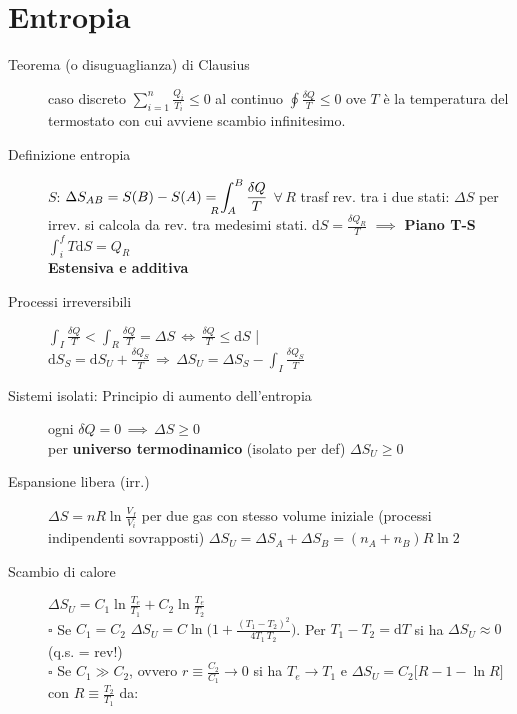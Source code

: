 \documentclass[10pt, oneside]{article}
\begin{document}
\section{Entropia}
\begin{description}
\item[\large Teorema (o disuguaglianza) di Clausius] caso discreto $\boxed{\displaystyle \sum\limits_{i=1}^n \frac{Q_i}{T_i} \leq 0}$ al continuo $\boxed{\displaystyle \oint \frac{\delta Q}{T} \leq 0}$ ove $T$ è la temperatura del termostato con cui avviene scambio infinitesimo.
\item[Definizione entropia] $S$: $\displaystyle \Delta S_{AB} = S(B) - S(A) = \int_{\hspace{-0.45cm} R \hspace{0.22cm} A}^B\frac{\delta Q}{T}$ $\forall \, R$ trasf rev. tra i due stati: $\Delta S$ per irrev. si calcola da rev. tra medesimi stati. $\displaystyle \mathrm{d}S = \frac{\delta Q_R}{T}$ $\implies$ \textbf{Piano T-S} $\displaystyle \int_i^f T\mathrm{d}S = Q_R$
\\\textbf{Estensiva e additiva}
\item[Processi irreversibili] $\displaystyle \int_I\frac{\delta Q}{T} < \int_R\frac{\delta Q}{T} = \Delta S \, \Leftrightarrow \, \frac{\delta Q}{T} \leq \mathrm{d}S$ \hfill \bigg| \hfill $\displaystyle \mathrm{d}S_S = \mathrm{d}S_U + \frac{\delta Q_S}{T} \, \Rightarrow \, \displaystyle \Delta S_U = \Delta S_S - \int_I \frac{\delta Q_S}{T}$
\item[Sistemi isolati: \large Principio di aumento dell'entropia] ogni $\delta Q = 0 \, \implies \, \Delta S \geq 0$ \\per \textbf{universo termodinamico} (isolato per def) $\displaystyle \Delta S_U \geq 0$
\item[Espansione libera (irr.)] $\displaystyle \Delta S = n R \ln \frac{V_f}{V_i}$ per due gas con stesso volume iniziale (processi indipendenti sovrapposti) $\displaystyle \Delta S_U = \Delta S_A + \Delta S_B = (n_A + n_B) R \ln2$
\item[Scambio di calore] $\displaystyle \Delta S_U = C_1 \ln \frac{T_e}{T_1} + C_2 \ln \frac{T_e}{T_2}$
\\$\square$ Se $C_1 = C_2$ $\displaystyle \Delta S_U = C \ln \bigg(\displaystyle 1+ \frac{(T_1 - T_2)^2}{4 T_1 \, T_2}\bigg)$. Per $T_1 - T_2 = \mathrm{d}T$ si ha $\Delta S_U 	\approx 0$ (q.s. = rev!)
\\$\square$ Se $C_1 \gg C_2$, ovvero $\displaystyle r \equiv \frac{C_2}{C_1} \rightarrow 0$ si ha $T_e \rightarrow T_1$ e $\boxed{\displaystyle \Delta S_U = C_2 \big[R - 1 - \ln R \big]}$ con $\displaystyle R \equiv \frac{T_2}{T_1}$ da:

\end{description}
\end{document}
